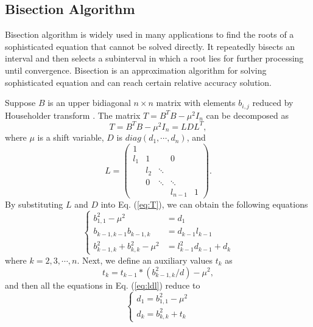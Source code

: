 \subsection{Bisection Algorithm}
Bisection algorithm is widely used in many applications to find the roots of a sophisticated equation that cannot be solved directly.
It repeatedly bisects an interval and then selects a subinterval in which a root lies for further processing until convergence.
Bisection is an approximation algorithm for solving sophisticated equation and can reach certain relative accuracy solution.

Suppose $B$ is an upper bidiagonal $n \times n$ matrix with elements $b_{i,j}$ reduced by Householder transform \cite{10householder}.
The matrix $T = B^T B - \mu^2 I_n$ can be decomposed as
\begin{equation}
\label{eq:T}
T = B^T B - \mu^2 I_n = L D L^T ,
\end{equation}
where $\mu$ is a shift variable, $D$ is $diag(d_{1}, \cdots, d_{n})$, and 
\begin{equation}
 L =  \left( \begin{array}{ccccc}
     1&      &       &        &  \\
 l_{1}& 1    &       & 0      &  \\
      & l_{2}& \ddots&        &  \\
      & 0    & \ddots& \ddots &  \\
      &      &       & l_{n-1}& 1
\end{array} \right) .
\label{eq:l}
\end{equation}
By substituting $L$ and $D$ into Eq. (\ref{eq:T}), we can obtain the following equations
\begin{equation}
\left \{
\begin{aligned}
b_{1,1}^2 - \mu^2 &= d_1\\
b_{k-1,k-1} b_{k-1,k} &= d_{k-1} l_{k-1}\\
b_{k-1,k}^2 + b_{k,k}^2 - \mu^2 &= l_{k-1}^2 d_{k-1} + d_k
\end{aligned}
\right .
\label{eq:ldl}
\end{equation}
where $k = 2,3,\cdots,n$.
Next, we define an auxiliary values $t_{k}$ as
\begin{equation}
t_{k} = t_{k-1} * (b_{k-1,k}^2 / d) - \mu^2 ,
\label{eq:tmp}
\end{equation}
and then all the equations in Eq. (\ref{eq:ldl}) reduce to
\begin{equation}
\left \{
\begin{aligned}
d_1 = b_{1,1}^2 - \mu^2 \\
d_k = b_{k,k}^2 + t_{k}
\end{aligned}
\right .
\label{eq:negcount}
\end{equation}

